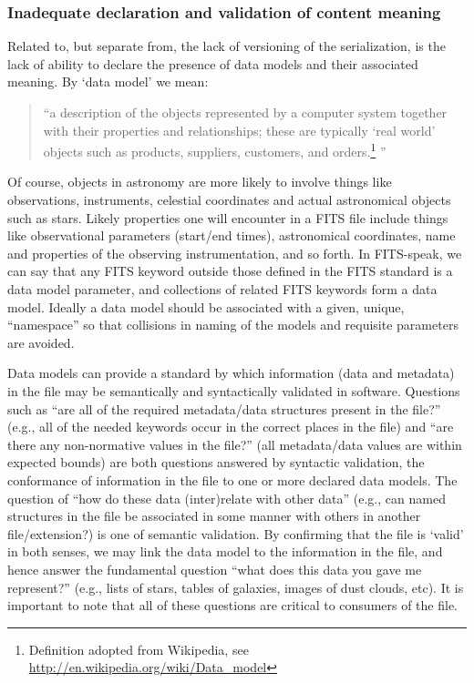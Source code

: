 \documentclass[final,authoryear,5p,times,twocolumn]{elsarticle}
\begin{document}
{{\subsubsection{Inadequate declaration and validation of content meaning}


Related to, but separate from, the lack of versioning of the
serialization, is the lack of ability to declare the presence of data
models and their associated meaning.  By `data model' we
mean:


\begin{quote}
``a description of the objects represented by a computer system
together with their properties and relationships; these are typically
`real world' objects such as products, suppliers, customers, and
orders.\footnote{Definition adopted from Wikipedia, see
\url{http://en.wikipedia.org/wiki/Data\_model}}
''
\end{quote}


Of course, objects in astronomy are more likely to involve things like
observations, instruments, celestial coordinates and actual astronomical
objects such as stars. Likely properties one will encounter in a FITS
file include things like observational parameters (start/end times),
astronomical coordinates, name and properties of the observing
instrumentation, and so forth. In FITS-speak, we can say that any FITS
keyword outside those defined in the FITS standard is a data model
parameter, and collections of related FITS keywords form a data model.
Ideally a data model should be associated with a given, unique,
``name\-space'' so that collisions in naming of the models and requisite
parameters are avoided.


Data models can provide a standard by which information (data and metadata)
in the file may be semantically and syntactically validated in software.
Questions such as ``are all of the required metadata/data structures present
in the file?'' (e.g., all of
the needed keywords occur in the correct places in the file) and ``are
there any non-normative values in the file?'' (all metadata/data values
are within expected bounds) are both questions answered by syntactic
validation, the conformance of information in the file to one or more
declared data models.  The question of ``how do these data (inter)relate
with other data'' (e.g., can named structures in the file be associated
in some manner with others in another file/extension?) is one of semantic
validation. By confirming that the file is `valid' in both senses, we may
link the data model to the information in the file, and hence answer the
fundamental question ``what does this data you gave me represent?'' (e.g., lists
of stars, tables of galaxies, images of dust clouds, etc).
It is important to note that all of these questions are critical to
consumers of the file.


}}
\end{document}
